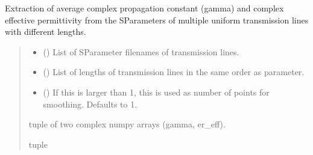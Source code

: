 \documentclass[letterpaper,10pt,english]{sphinxmanual}
\begin{document}

\begin{fulllineitems}
\label{\detokenize{touchstone:touchstone.extract_gamma_ereff_all}}
\pysigstartsignatures
{}
\pysigstopsignatures
\sphinxAtStartPar
Extraction of average complex propagation constant (gamma) and complex effective permittivity from the S\sphinxhyphen{}Parameters of multiple uniform transmission lines with different lengths.
\begin{quote}\begin{description}
\begin{itemize}
\item {} 
\sphinxAtStartPar
{} () \textendash{} List of S\sphinxhyphen{}Parameter filenames of transmission lines.

\item {} 
\sphinxAtStartPar
{} () \textendash{} List of lengths of transmission lines in the same order as  parameter.

\item {} 
\sphinxAtStartPar
{} (\sphinxstyleliteralemphasis{\sphinxupquote{, }}) \textendash{} If this is larger than 1, this is used as number of points for smoothing. Defaults to 1.

\end{itemize}

\sphinxAtStartPar
tuple of two complex numpy arrays (gamma, er\_eff).

\sphinxAtStartPar
tuple

\end{description}\end{quote}

\end{fulllineitems}

\end{document}
